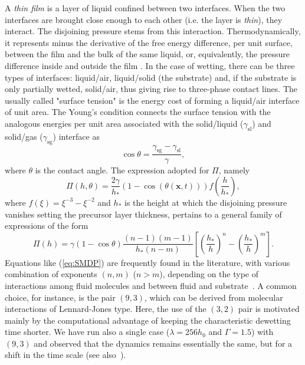 \documentclass[amsmath,amssymb,showpacs,prl,superscriptaddress,notitlepage]{revtex4-1}
\begin{document}
\noindent A {\it thin film} is a layer of liquid confined between two interfaces. When the two interfaces are brought close enough to each other (i.e. the layer is {\it thin}), they interact.
The disjoining pressure stems from this interaction. Thermodynamically, it represents minus the derivative of the free energy difference, per unit surface, between 
the film and the bulk of the same liquid, or, equivalently, the pressure difference inside and outside the film 
\cite{Deryaguin1940,DeryaguinChuraev1978}.
In the case of wetting, there can be three types of interfaces: liquid/air, liquid/solid (the substrate) and, 
if the substrate is only partially wetted, solid/air, thus giving rise to three-phase contact lines. 
The usually called "surface tension" is the energy cost of forming a liquid/air interface of unit area. 
The Young's condition \cite{Young1805,DeGennes1985} connects the surface tension with the analogous energies per unit
area associated with the solid/liquid ($\gamma_{\text{sl}}$) and solid/gas ($\gamma_{\text{sg}}$) interface as
\begin{equation}
\cos \theta = \frac{\gamma_{\text{sg}}-\gamma_{\text{sl}}}{\gamma},
\end{equation}
where $\theta$ is the contact angle.
The expression adopted for $\Pi$, namely
\begin{equation}
\Pi(h,\theta) = \frac{2\gamma}{h_{\ast}}(1-\cos(\theta(\mathbf{x},t)))
  f\left(\frac{h}{h_{\ast}}\right),
\end{equation}
where $f(\xi)=\xi^{-3} - \xi^{-2}$ and $h_{\ast}$ is the height at which the disjoining pressure vanishes setting the precursor layer thickness, pertains to a general family of expressions of 
the form 
\begin{equation}\label{eq:SMDP}
\Pi(h) = \gamma(1-\cos \theta)\frac{(n-1)(m-1)}{h_{\ast}(n-m)}\left[\left(\frac{h_{\ast}}{h}\right)^n - 
\left(\frac{h_{\ast}}{h}\right)^m\right].
\end{equation}
Equations like (\ref{eq:SMDP}) are frequently found in the literature, 
with various combination of exponents $(n,m)$ ($n>m$), depending
on the type of interactions among fluid molecules and between fluid and substrate~\cite{SCHWARTZ1998173,Mitlin,Teletzke}. A common choice, for instance, is the pair $(9,3)$, which 
can be derived from molecular interactions of Lennard-Jones type. Here, the use of the $(3,2)$ pair is motivated mainly by the computational advantage of keeping the characteristic dewetting time 
shorter. We have run also a single case ($\lambda=256 h_0$ and $\Gamma=1.5$) with $(9,3)$ and observed that 
the dynamics remains essentially the same, but for a shift in the time scale (see also~\cite{PhysRevE.104.034801}).
\end{document}
